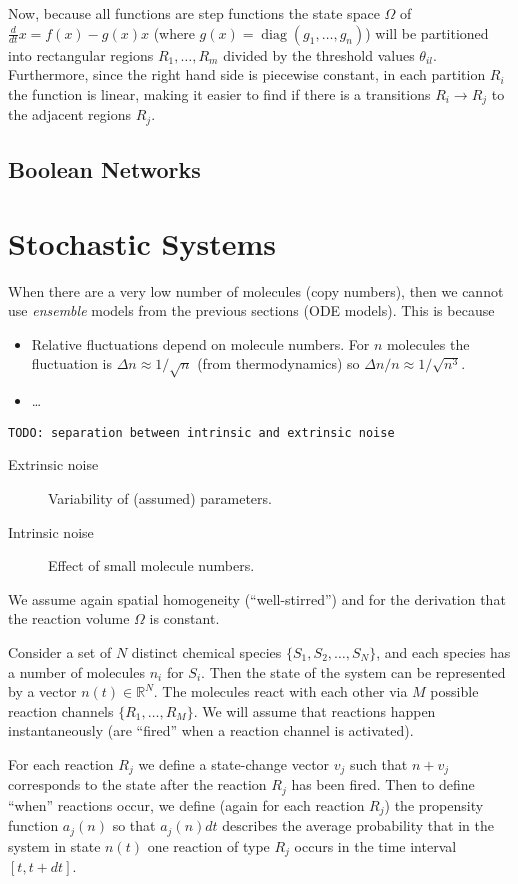 \documentclass[a4paper]{article}
\newcommand{\todo}[1]{\texttt{TODO: #1}}
\theoremstyle{plain}
\theoremstyle{definition}
\theoremstyle{remark}
\begin{document}
Now, because all functions are step functions the state space $\Omega$ of
$\frac{d}{dt} x = f(x) - g(x) x$ (where $g(x) = \operatorname{diag}(g_1,
\ldots, g_n)$) will be partitioned into rectangular regions $R_1, \ldots, R_m$
divided by the threshold values $\theta_{il}$. Furthermore, since the right
hand side is piecewise constant, in each partition $R_i$ the function is
linear, making it easier to find if there is a transitions $R_i \to R_j$ to
the adjacent regions $R_j$.

\subsection{Boolean Networks}


\section{Stochastic Systems}

When there are a very low number of molecules (copy numbers), then we cannot
use \emph{ensemble} models from the previous sections (ODE models). This is
because
\begin{itemize}
  \item Relative fluctuations depend on molecule numbers. For $n$ molecules
    the fluctuation is $\Delta n \approx 1 / \sqrt{n}$ (from thermodynamics)
    so $\Delta n / n \approx 1 / \sqrt{n^3}$.
  \item \ldots
\end{itemize}

\todo{separation between intrinsic and extrinsic noise}

\begin{description}
  \item[Extrinsic noise] Variability of (assumed) parameters.
  \item[Intrinsic noise] Effect of small molecule numbers.
\end{description}

We assume again spatial homogeneity (``well-stirred'') and for the derivation
that the reaction volume $\Omega$ is constant.

Consider a set of $N$ distinct chemical species $\{S_1, S_2, \ldots, S_N\}$,
and each species has a number of molecules $n_i$ for $S_i$. Then the state of
the system can be represented by a vector $n(t) \in \mathbb{R}^N$. The
molecules react with each other via $M$ possible reaction channels $\{R_1,
\ldots, R_M\}$. We will assume that reactions happen instantaneously (are
``fired'' when a reaction channel is activated).

For each reaction $R_j$ we define a state-change vector $v_j$ such that $n +
v_j$ corresponds to the state after the reaction $R_j$ has been fired. Then to
define ``when'' reactions occur, we define (again for each reaction $R_j$) the
propensity function $a_j(n)$ so that $a_j(n) dt$ describes the average
probability that in the system in state $n(t)$ one reaction of type $R_j$
occurs in the time interval $[t, t + dt]$.
\end{document}
